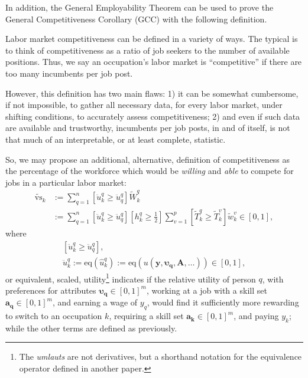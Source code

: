 \documentclass[hidelinks, nonatbib]{elsarticle}
\begin{document}
In addition, the General Employability Theorem can be used to prove the General Competitiveness Corollary (GCC) with the following definition.
\begin{definition}[Competitiveness]
    \label{def_competitiveness}
    Labor market competitiveness can be defined in a variety of ways. The typical is to think of competitiveness as a ratio of job seekers to the number of available positions. Thus, we say an occupation's labor market is ``competitive'' if there are too many incumbents per job post.
    
    However, this definition has two main flaws: 1) it can be somewhat cumbersome, if not impossible, to gather all necessary data, for every labor market, under shifting conditions, to accurately assess competitiveness; 2) and even if such data are available and trustworthy, incumbents per job posts, in and of itself, is not that much of an interpretable, or at least complete, statistic.
    
    So, we may propose an additional, alternative, definition of competitiveness as the percentage of the workforce which would be \textit{willing} and \textit{able} to compete for jobs in a particular labor market:
    \begin{align}
        \tilde{\text{vs}}_{k}
        &:=
        \sum_{q=1}^{n}
        \left[
            \ddot{u}_{k}^{q}
            \geq
            \ddot{u}_{q}^{q}
        \right]
        \tilde{W}_{k}^{q}
        \\
        &:=
        \sum_{q=1}^{n}
        \left[
            \ddot{u}_{k}^{q}
            \geq
            \ddot{u}_{q}^{q}
        \right]
        \left[
            h_{k}^{q}
            \geq
            \frac{1}{2}
        \right]
        \sum_{v=1}^{p}
        \left[
            \tilde{T}_{k}^{q}
            \geq
            \tilde{T}_{k}^{v}
        \right]
        \tilde{w}_{k}^{v}
        \in
        [0,1]
        ,
        \end{align}
    where
    \begin{gather}
        \left[
            \ddot{u}_{k}^{q}
            \geq
            \ddot{u}_{q}^{q}
        \right]
        ,
        \\
        \ddot{u}_{k}^{q} 
        :=
        \text{eq}(
            \hat{u}_{k}^{q}
        )
        :=
        \text{eq}\left(
            u(
            \boldsymbol{y},
            \boldsymbol{\upsilon_q},
            \textbf{A},
            \dots
        )
        \right)
        \in
        [0,1]
        ,
    \end{gather}
    or equivalent, scaled, utility\footnote{The \textit{umlauts} are not derivatives, but a shorthand notation for the equivalence operator defined in another paper.} indicates if the relative utility of person $q$, with preferences for attributes $\boldsymbol{\upsilon_q} \in [0,1] ^ m$, working at a job with a skill set $\boldsymbol{a_q} \in [0,1] ^ m$, and earning a wage of $y_q$, would find it sufficiently more rewarding to switch to an occupation $k$, requiring a skill set $\boldsymbol{a_k} \in [0,1] ^ m$, and paying $y_k$; while the other terms are defined as previously.
    

\end{definition}
\end{document}
